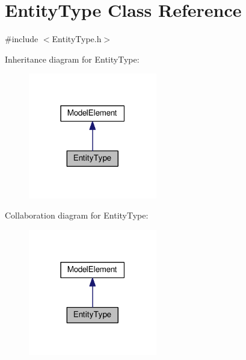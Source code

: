 \hypertarget{class_entity_type}{}\section{Entity\+Type Class Reference}
\label{class_entity_type}


{\ttfamily \#include $<$Entity\+Type.\+h$>$}



Inheritance diagram for Entity\+Type\+:\nopagebreak
\begin{figure}[H]
\begin{center}
\leavevmode
\includegraphics[width=159pt]{class_entity_type__inherit__graph}
\end{center}
\end{figure}


Collaboration diagram for Entity\+Type\+:\nopagebreak
\begin{figure}[H]
\begin{center}
\leavevmode
\includegraphics[width=159pt]{class_entity_type__coll__graph}
\end{center}
\end{figure}

